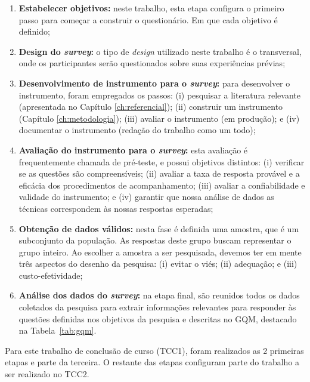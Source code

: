 \begin{enumerate}
\item \textbf{Estabelecer objetivos:} neste trabalho, esta etapa configura o primeiro passo para começar a construir o questionário. Em que cada objetivo é definido;

\item \textbf{Design do \textit{survey}:} o tipo de \textit{design} utilizado neste trabalho é o transversal, onde os participantes serão questionados sobre suas experiências prévias;

\item \textbf{Desenvolvimento de instrumento para o \textit{survey}:} para desenvolver o instrumento, foram empregados os passos: (i) pesquisar a literatura relevante (apresentada no Capítulo \ref{ch:referencial}); (ii) construir um instrumento (Capítulo \ref{ch:metodologia}); (iii) avaliar o instrumento (em produção); e (iv) documentar o instrumento (redação do trabalho como um todo);

\item \textbf{Avaliação do instrumento para o \textit{survey}:} esta avaliação é frequentemente chamada de pré-teste, e possui objetivos distintos: (i) verificar se as questões são compreensíveis; (ii) avaliar a taxa de resposta provável e a eficácia dos procedimentos de acompanhamento; (iii) avaliar a confiabilidade e validade do instrumento; e (iv) garantir que nossa análise de dados as técnicas correspondem às nossas respostas esperadas;

\item \textbf{Obtenção de dados válidos:} nesta fase é definida uma amostra, que é um subconjunto da população. As respostas deste grupo buscam representar o grupo inteiro. Ao escolher a amostra a ser pesquisada, devemos ter em mente três aspectos do desenho da pesquisa: (i) evitar o viés; (ii) adequação; e (iii) custo-efetividade;

\item \textbf{Análise dos dados do \textit{survey}:} na etapa final, são reunidos todos os dados coletados da pesquisa para extrair informações relevantes para responder às questões definidas nos objetivos da pesquisa e descritas no GQM, destacado na Tabela~\ref{tab:gqm}.
\end{enumerate}

Para este trabalho de conclusão de curso (TCC1), foram realizados as 2 primeiras etapas e parte da terceira. O restante das etapas configuram parte do trabalho a ser realizado no TCC2.

